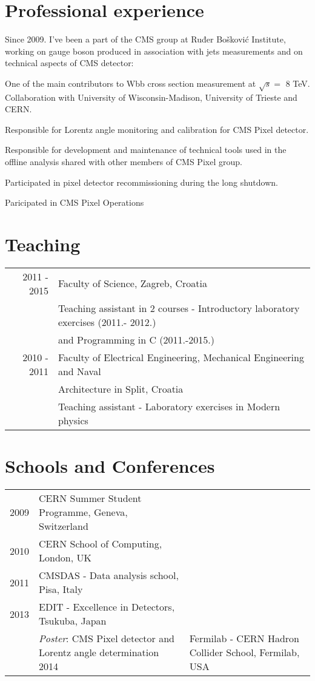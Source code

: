 \documentclass[letterpaper,12pt]{article}
\renewenvironment{itemize}{
  \begin{list}{}{
    \setlength{\leftmargin}{1.5em}
  }
}{
  \end{list}
}
\begin{document}
\section*{Professional experience}

Since 2009. I've been a part of the CMS group at Ruđer Bošković Institute, working on gauge boson produced in association with jets measurements and on technical aspects of CMS detector:
\begin{itemize}
\item One of the main contributors to Wbb cross section measurement at $\sqrt{s} =$ 8 TeV. Collaboration with University of Wisconsin-Madison, University of Trieste and CERN.
\item Responsible for Lorentz angle monitoring and calibration for CMS Pixel detector.
\item Responsible for development and maintenance of technical tools used in the offline analysis shared with other members of CMS Pixel group.
\item Participated in pixel detector recommissioning during the long shutdown. 
\item Paricipated in CMS Pixel Operations
\end{itemize}



\section*{Teaching}

\begin{tabular}{r | l}
  2011 - 2015 & Faculty of Science, Zagreb, Croatia \\ & Teaching assistant in 2 courses - Introductory laboratory exercises (2011.- 2012.) \\ & and Programming in C (2011.-2015.) \\
  2010 - 2011 & Faculty of Electrical Engineering, Mechanical Engineering and Naval \\ & Architecture in Split, Croatia \\ & Teaching assistant - Laboratory exercises in Modern physics 
\end{tabular}

\section*{Schools and Conferences}

\begin{tabular}{r | l}
  2009 & CERN Summer Student Programme, Geneva, Switzerland \\
  2010 & CERN School of Computing, London, UK \\ 
  2011 & CMSDAS - Data analysis school, Pisa, Italy \\
  2013 & EDIT - Excellence in Detectors, Tsukuba, Japan \\
  	   & \textit{Poster}: CMS Pixel detector and Lorentz angle determination
  2014 & Fermilab - CERN Hadron Collider School, Fermilab, USA\\
\end{tabular}
\end{document}

